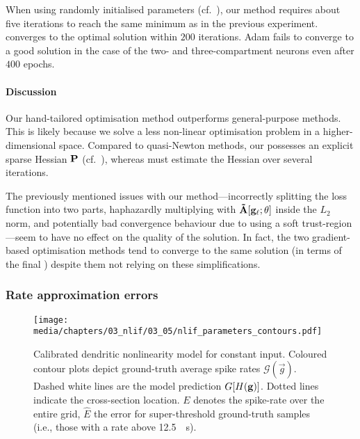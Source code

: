 When using randomly initialised parameters (cf.~), our method requires about five iterations to reach the same minimum as in the previous experiment.
\LBFGSB converges to the optimal solution within $200$ iterations.
Adam fails to converge to a good solution in the case of the two- and three-compartment neurons even after $400$ epochs.

\paragraph{Discussion}
Our hand-tailored optimisation method outperforms general-purpose methods.
This is likely because we solve a less non-linear optimisation problem in a higher-dimensional space.
Compared to quasi-Newton methods, our \QP possesses an explicit sparse Hessian $\mathbf{P}$ (cf.~), whereas \LBFGSB must estimate the Hessian over several iterations.

The previously mentioned issues with our method---incorrectly splitting the loss function into two parts, haphazardly multiplying with $\mathbf{\tilde A}[\mathbf{g}_\ell; \mathbf{\theta}]$ inside the $L_2$ norm, and potentially bad convergence behaviour due to using a soft trust-region---seem to have no effect on the quality of the solution.
In fact, the two gradient-based optimisation methods tend to converge to the same solution (in terms of the final \NRMSE) despite them not relying on these simplifications.

\subsubsection{Rate approximation errors}

\begin{figure}[t]
	\texttt{[image: media/chapters/03\_nlif/03\_05/nlif\_parameters\_contours.pdf]}
	\caption[Calibrated $n$-LIF dendritic nonlinearity model for constant input]{
		Calibrated \nlif dendritic nonlinearity model for constant input.
		Coloured contour plots depict ground-truth average spike rates $\mathscr{G}(\vec g)$.
		Dashed white lines are the model prediction $G[{H}(\mathbf{g})]$. Dotted lines indicate the cross-section location.
		$E$ denotes the spike-rate \RMSE over the entire grid, $\hat E$ the error for super-threshold ground-truth samples (i.e., those with a rate above \SI{12.5}{\per\second}).
	}
	\label{fig:nlif_parameters_contours}
\end{figure}

